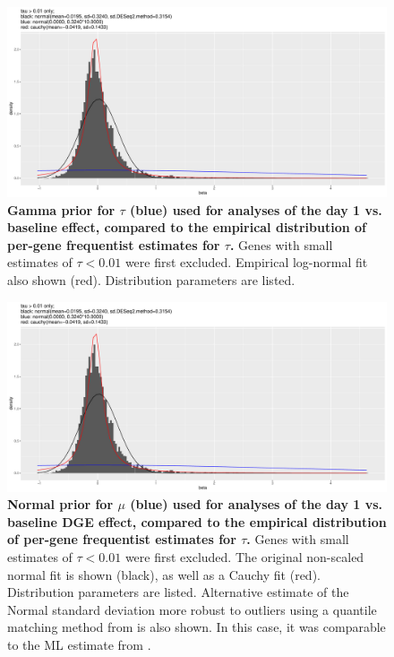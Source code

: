 \begin{figure}
    \includegraphics[width=1.0\textwidth,page=2]{mainmatter/figures/chapter_02/meta.bayesmeta.priors.coefName_d1.vs.d0.pdf}
    \caption{
        \textbf{Gamma prior for $\tau$ (blue) used for  analyses of the day 1 vs. baseline effect, compared to the empirical distribution of per-gene frequentist  estimates for $\tau$.}
        Genes with small estimates of $\tau < 0.01$ were first excluded.
        Empirical log-normal fit also shown (red).
        Distribution parameters are listed.
    }
    \label{fig:hird_dgeMeta_priors_tau}
\end{figure}

\begin{figure}
    \includegraphics[width=1.0\textwidth,page=1]{mainmatter/figures/chapter_02/meta.bayesmeta.priors.coefName_d1.vs.d0.pdf}
    \caption{
        \textbf{Normal prior for $\mu$ (blue) used for  analyses of the day 1 vs. baseline \gls{DGE} effect, compared to the empirical distribution of per-gene frequentist  estimates for $\tau$.}
        Genes with small estimates of $\tau < 0.01$ were first excluded.
        The original non-scaled normal fit is shown (black), as well as a Cauchy fit (red).
        Distribution parameters are listed.
        Alternative estimate of the Normal standard deviation more robust to outliers using a quantile matching method from  \autocite{love2014ModeratedEstimationFold} is also shown.
        In this case, it was comparable to the \gls{ML} estimate from .
    }
    \label{fig:hird_dgeMeta_priors_mu}
\end{figure}

